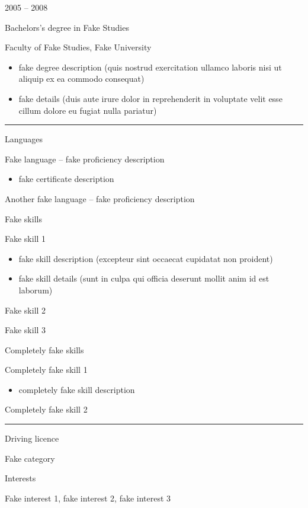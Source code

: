 \documentclass[a4paper,10pt]{article}
\newlength{\cvcolumngapwidth}
\newlength{\cvleftcolumnwidth}
\newlength{\cvrightcolumnwidth}
\newcommand{\cvsectionstyle}[1]{{\normalsize\cvsectionfont\textcolor{cvsectioncolor}{#1}}}
\newcommand{\cvtitlestyle}[1]{{\large\cvtitlefont\textcolor{cvtitlecolor}{#1}}}
\newcommand{\cvdurationstyle}[1]{{\small\cvdurationfont\textcolor{cvdurationcolor}{#1}}}
\newcommand{\cvheadingstyle}[1]{{\normalsize\cvheadingfont\textcolor{cvheadingcolor}{#1}}}
\newlength{\cvafteritemskipamount}
\newlength{\cvaftersectionskipamount}
\newlength{\cvbetweensectionandheadingextraskipamount}
\newlength{\cvaftertitleskipamount}
\newlength{\cvparskip}
\newcommand{\cvsection}[1]{
    \begin{minipage}[t]{\cvleftcolumnwidth}
        \raggedleft\cvsectionstyle{#1}
    \end{minipage}%
    \hspace{\cvcolumngapwidth}%
    \begin{minipage}[t]{\cvrightcolumnwidth}
        \textcolor{cvrulecolor}{\rule{\cvrightcolumnwidth}{0.3mm}}
    \end{minipage}

    \vspace{\cvaftersectionskipamount}
}
\newcommand{\cvitem}[2]{
    \begin{minipage}[t]{\cvleftcolumnwidth}
        \raggedleft #1
    \end{minipage}%
    \hspace{\cvcolumngapwidth}%
    \begin{minipage}[t]{\cvrightcolumnwidth}
        \setlength{\parskip}{\cvparskip} #2
    \end{minipage}

    \vspace{\cvafteritemskipamount}
}
\newcommand{\cvtitle}[1]{
    \cvtitlestyle{#1}

    \vspace{\cvaftertitleskipamount}
    \vspace{-\cvparskip}
}
\begin{document}
\cvitem{
    \cvdurationstyle{2005 -- 2008}
}{
    \cvtitle{Bachelors's degree in Fake Studies}

    Faculty of Fake Studies, Fake University

    \begin{itemize}[leftmargin=*]
        \item fake degree description (quis nostrud exercitation ullamco laboris nisi ut aliquip ex ea commodo
              consequat)
        \item fake details (duis aute irure dolor in reprehenderit in voluptate velit esse cillum dolore eu fugiat
              nulla pariatur)
    \end{itemize}
}



\cvsection{SKILLS}

\vspace{\cvbetweensectionandheadingextraskipamount}

\cvitem{
    \cvheadingstyle{Languages}
}{
    Fake language -- fake proficiency description
    \begin{itemize}
        \item fake certificate description
    \end{itemize}

    Another fake language -- fake proficiency description
}

\cvitem{
    \cvheadingstyle{Fake skills}
}{
    Fake skill 1
    \begin{itemize}
        \item fake skill description (excepteur sint occaecat cupidatat non proident)
        \item fake skill details (sunt in culpa qui officia deserunt mollit anim id est laborum)
    \end{itemize}

    Fake skill 2

    Fake skill 3
}

\cvitem{
    \cvheadingstyle{Completely fake skills}
}{
    Completely fake skill 1
    \begin{itemize}
        \item completely fake skill description
    \end{itemize}

    Completely fake skill 2
}



\cvsection{ADDITIONAL INFORMATION}

\vspace{\cvbetweensectionandheadingextraskipamount}

\cvitem{
    \cvheadingstyle{Driving licence}
}{
    Fake category
}

\cvitem{
    \cvheadingstyle{Interests}
}{
    Fake interest 1, fake interest 2, fake interest 3
}
\end{document}
